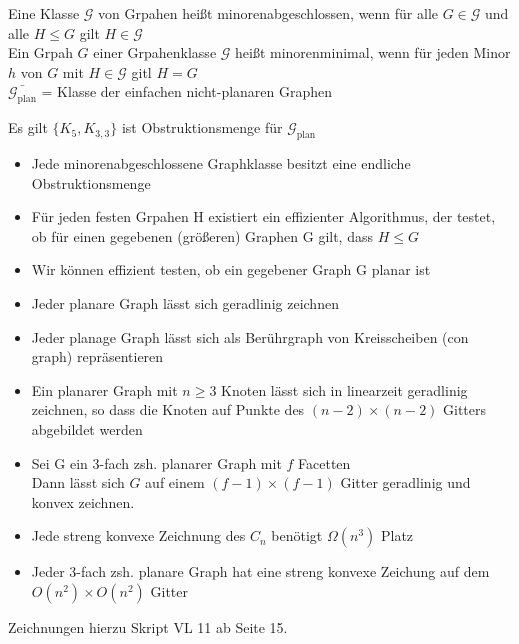 \documentclass[14pt]{article}
\begin{document}
\begin{definition}[Minoren]
    Eine Klasse $\mathcal{G}$ von Grpahen heißt minorenabgeschlossen, 
    wenn für alle $ G \in \mathcal{G}$ und alle $H \leq G$ gilt 
    $H \in \mathcal{G}$ \\
    Ein Grpah $G$ einer Grpahenklasse $\mathcal{G}$ heißt 
    minorenminimal, wenn für jeden Minor $h$ von $G$ mit 
    $H \in \mathcal{G}$ gitl $H = G$ \\
    $\bar{\mathcal{G}_{\text{plan}}}$ = Klasse der einfachen
    nicht-planaren Graphen
\end{definition}
\begin{definition}[Obstruktionsmenge]
    Es gilt $\{ K_5, K_{3, 3}\}$ ist Obstruktionsmenge für 
    $\mathcal{G}_{\text{plan}}$
\end{definition}
\begin{eigenschaft}
    \begin{itemize}
        \item Jede minorenabgeschlossene Graphklasse besitzt eine
        endliche Obstruktionsmenge
        \item Für jeden festen Grpahen H existiert ein effizienter
        Algorithmus, der testet, ob für einen gegebenen (größeren)
        Graphen G gilt, dass $H \leq G$
        \item Wir können effizient testen, ob ein gegebener Graph G
        planar ist
        \item Jeder planare Graph lässt sich geradlinig zeichnen
        \item Jeder planage Graph lässt sich als Berührgraph von 
        Kreisscheiben (con graph) repräsentieren
        \item Ein planarer Graph mit $n \geq 3$ Knoten lässt sich in
        linearzeit geradlinig zeichnen, so dass die Knoten auf
        Punkte des $(n - 2) \times (n - 2)$ Gitters abgebildet werden
        \item Sei G ein 3-fach zsh. planarer Graph mit $f$ Facetten \\
        Dann lässt sich $G$ auf einem $(f - 1) \times (f - 1)$ Gitter
        geradlinig und konvex zeichnen.
        \item Jede streng konvexe Zeichnung des $C_n$ benötigt
        $\Omega(n^3)$ Platz
        \item Jeder 3-fach zsh. planare Graph hat eine streng
        konvexe Zeichung auf dem $O(n^2) \times O(n^2)$ Gitter
    \end{itemize}
    Zeichnungen hierzu Skript VL 11 ab Seite 15.
\end{eigenschaft}
\end{document}
